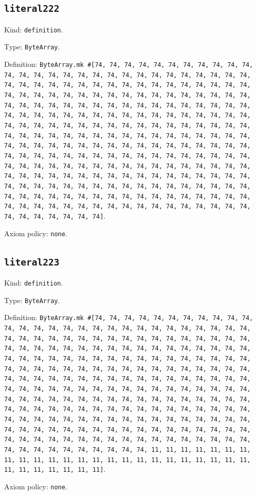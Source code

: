 \documentclass[11pt]{article}
\begin{document}
\subsection*{\texttt{literal222}}
\noindent Kind: \texttt{definition}.\par
\noindent Type: \texttt{ByteArray}.\par
\noindent Definition: \texttt{ByteArray.mk \#[74, 74, 74, 74, 74, 74, 74, 74, 74, 74, 74, 74, 74, 74, 74, 74, 74, 74, 74, 74, 74, 74, 74, 74, 74, 74, 74, 74, 74, 74, 74, 74, 74, 74, 74, 74, 74, 74, 74, 74, 74, 74, 74, 74, 74, 74, 74, 74, 74, 74, 74, 74, 74, 74, 74, 74, 74, 74, 74, 74, 74, 74, 74, 74, 74, 74, 74, 74, 74, 74, 74, 74, 74, 74, 74, 74, 74, 74, 74, 74, 74, 74, 74, 74, 74, 74, 74, 74, 74, 74, 74, 74, 74, 74, 74, 74, 74, 74, 74, 74, 74, 74, 74, 74, 74, 74, 74, 74, 74, 74, 74, 74, 74, 74, 74, 74, 74, 74, 74, 74, 74, 74, 74, 74, 74, 74, 74, 74, 74, 74, 74, 74, 74, 74, 74, 74, 74, 74, 74, 74, 74, 74, 74, 74, 74, 74, 74, 74, 74, 74, 74, 74, 74, 74, 74, 74, 74, 74, 74, 74, 74, 74, 74, 74, 74, 74, 74, 74, 74, 74, 74, 74, 74, 74, 74, 74, 74, 74, 74, 74, 74, 74, 74, 74, 74, 74, 74, 74, 74, 74, 74, 74, 74, 74, 74, 74, 74, 74, 74, 74, 74, 74, 74, 74, 74, 74, 74, 74, 74, 74, 74, 74, 74, 74, 74, 74, 74, 74, 74, 74, 74, 74, 74, 74, 74, 74, 74, 74, 74, 74, 74, 74, 74, 74, 74, 74, 74, 74, 74, 74, 74, 74, 74, 74, 74, 74, 74, 74, 74, 74, 74, 74, 74, 74, 74, 74]}.\par
\noindent Axiom policy: \texttt{none}.\par
\subsection*{\texttt{literal223}}
\noindent Kind: \texttt{definition}.\par
\noindent Type: \texttt{ByteArray}.\par
\noindent Definition: \texttt{ByteArray.mk \#[74, 74, 74, 74, 74, 74, 74, 74, 74, 74, 74, 74, 74, 74, 74, 74, 74, 74, 74, 74, 74, 74, 74, 74, 74, 74, 74, 74, 74, 74, 74, 74, 74, 74, 74, 74, 74, 74, 74, 74, 74, 74, 74, 74, 74, 74, 74, 74, 74, 74, 74, 74, 74, 74, 74, 74, 74, 74, 74, 74, 74, 74, 74, 74, 74, 74, 74, 74, 74, 74, 74, 74, 74, 74, 74, 74, 74, 74, 74, 74, 74, 74, 74, 74, 74, 74, 74, 74, 74, 74, 74, 74, 74, 74, 74, 74, 74, 74, 74, 74, 74, 74, 74, 74, 74, 74, 74, 74, 74, 74, 74, 74, 74, 74, 74, 74, 74, 74, 74, 74, 74, 74, 74, 74, 74, 74, 74, 74, 74, 74, 74, 74, 74, 74, 74, 74, 74, 74, 74, 74, 74, 74, 74, 74, 74, 74, 74, 74, 74, 74, 74, 74, 74, 74, 74, 74, 74, 74, 74, 74, 74, 74, 74, 74, 74, 74, 74, 74, 74, 74, 74, 74, 74, 74, 74, 74, 74, 74, 74, 74, 74, 74, 74, 74, 74, 74, 74, 74, 74, 74, 74, 74, 74, 74, 74, 74, 74, 74, 74, 74, 74, 74, 74, 74, 74, 74, 74, 74, 74, 74, 74, 74, 74, 74, 74, 74, 74, 74, 74, 74, 74, 74, 74, 74, 74, 11, 11, 11, 11, 11, 11, 11, 11, 11, 11, 11, 11, 11, 11, 11, 11, 11, 11, 11, 11, 11, 11, 11, 11, 11, 11, 11, 11, 11, 11, 11]}.\par
\noindent Axiom policy: \texttt{none}.\par
\end{document}

